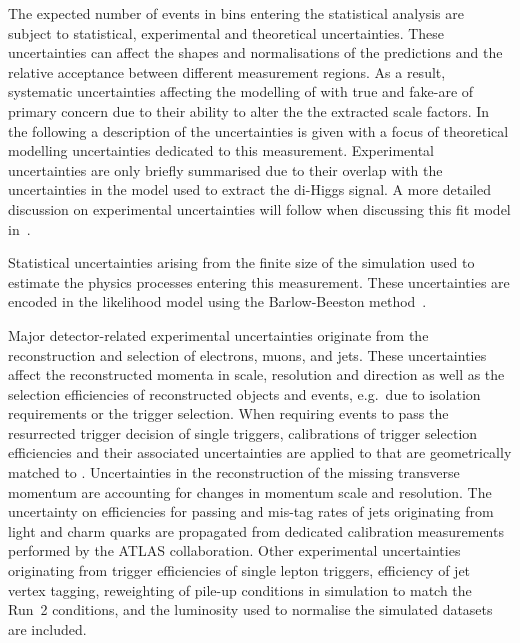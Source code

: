 The expected number of events in bins entering the statistical
analysis are subject to statistical, experimental and theoretical
uncertainties. These uncertainties can affect the shapes and
normalisations of the predictions and the relative acceptance between
different measurement regions. As a result, systematic uncertainties
affecting the modelling of \ttbar with true and fake-\tauhadvis are of
primary concern due to their ability to alter the the extracted scale
factors. In the following a description of the uncertainties is given
with a focus of theoretical modelling uncertainties dedicated to this
measurement. Experimental uncertainties are only briefly summarised
due to their overlap with the uncertainties in the model used to
extract the di-Higgs signal. A more detailed discussion on
experimental uncertainties will follow when discussing this fit model
in~.

Statistical uncertainties arising from the finite size of the
simulation used to estimate the physics processes entering this
measurement. These uncertainties are encoded in the likelihood model
using the Barlow-Beeston method~\cite{barlow1993,conway2011}.

Major detector-related experimental uncertainties originate from the
reconstruction and selection of electrons, muons, \tauhadvis and jets.
These uncertainties affect the reconstructed momenta in scale,
resolution and direction as well as the selection efficiencies of
reconstructed objects and events, e.g.~due to isolation requirements
or the trigger selection. When requiring events to pass the
resurrected trigger decision of single \tauhadvis triggers,
calibrations of trigger selection efficiencies and their associated
uncertainties are applied to \tauhadvis that are geometrically matched
to \tauhad. Uncertainties in the reconstruction of the missing
transverse momentum are accounting for changes in momentum scale and
resolution. The uncertainty on efficiencies for \bjets passing \btag
and mis-tag rates of jets originating from light and charm quarks are
propagated from dedicated calibration measurements performed by the
ATLAS collaboration. Other experimental uncertainties originating from
trigger efficiencies of single lepton triggers, efficiency of jet
vertex tagging, reweighting of pile-up conditions in simulation to
match the Run~2 conditions, and the luminosity used to normalise the
simulated datasets are included.

